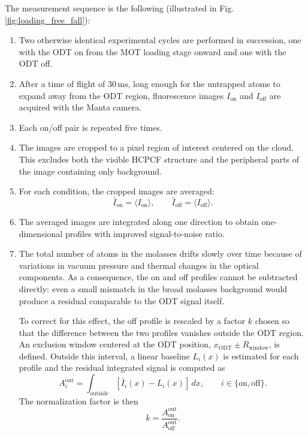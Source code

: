 The measurement sequence is the following (illustrated in Fig. \ref{fig:loading_free_fall}):

\begin{enumerate}
    \item Two otherwise identical experimental cycles are performed in succession, one with the ODT on from the MOT loading stage onward and one with the ODT off.
    \item After a time of flight of $30\,\mathrm{ms}$, long enough for the untrapped atoms to expand away from the ODT region, fluorescence images $I_{\mathrm{on}}$ and $I_{\mathrm{off}}$ are acquired with the Manta camera.
    \item Each on/off pair is repeated five times.
    \item The images are cropped to a pixel region of interest centered on the cloud. This excludes both the visible HCPCF structure and the peripheral parts of the image containing only background.
    \item For each condition, the cropped images are averaged:
    \begin{equation}
        \bar I_{\mathrm{on}} = \langle I_{\mathrm{on}} \rangle,
        \qquad
        \bar I_{\mathrm{off}} = \langle I_{\mathrm{off}} \rangle.
    \end{equation}
    \item The averaged images are integrated along one direction to obtain one-dimensional profiles with improved signal-to-noise ratio.
    \item The total number of atoms in the molasses drifts slowly over time because of variations in vacuum pressure and thermal changes in the optical components. As a consequence, the on and off profiles cannot be subtracted directly: even a small mismatch in the broad molasses background would produce a residual comparable to the ODT signal itself.
    
    To correct for this effect, the off profile is rescaled by a factor $k$ chosen so that the difference between the two profiles vanishes outside the ODT region. An exclusion window centered at the ODT position, $x_{\mathrm{ODT}} \pm R_{\mathrm{window}}$, is defined. Outside this interval, a linear baseline $L_i(x)$ is estimated for each profile and the residual integrated signal is computed as
    \begin{equation}
         A_i^{\mathrm{out}} = \int_{\mathrm{outside}} \left[\bar{I}_i(x) - L_i(x)\right]\,dx,
         \qquad i \in \{\mathrm{on, off}\}.
    \end{equation}
    The normalization factor is then
    \begin{equation}
        k = \frac{A_{\mathrm{on}}^{\mathrm{out}}}{A_{\mathrm{off}}^{\mathrm{out}}}.
    \end{equation}
    

\end{enumerate}
